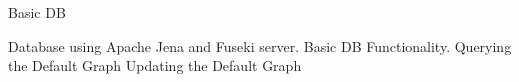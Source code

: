 \begin{frame}{Basic DB}
	\begin{outline}
 \1 Database using Apache Jena and Fuseki server.
   \1 Basic DB Functionality.
     \2  Querying the Default Graph
     \2 Updating the Default Graph
     
\end{outline}
\end{frame}
